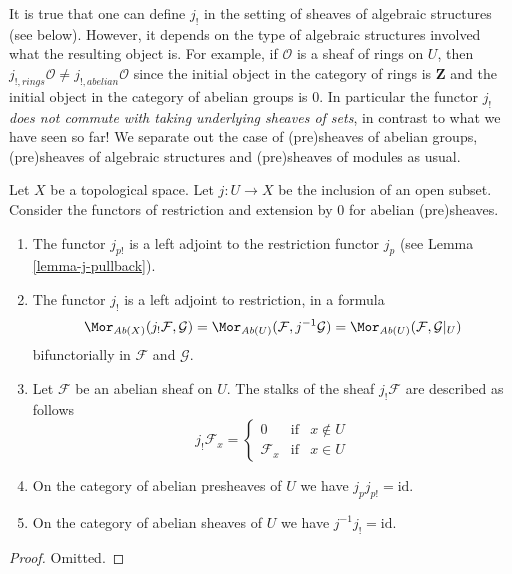 \noindent
It is true that one can define $j_!$ in the setting of sheaves
of algebraic structures (see below). However, it depends on the
type of algebraic structures involved what the resulting
object is. For example, if $\mathcal{O}$ is a sheaf of rings
on $U$, then $j_{!, rings}\mathcal{O} \not = j_{!, abelian}\mathcal{O}$
since the initial object in the category of rings
is $\mathbf{Z}$ and the initial object in the category
of abelian groups is $0$. In particular the functor $j_!$
{\it does not commute with taking underlying sheaves of sets},
in contrast to what we have seen so far! We separate out the case
of (pre)sheaves of abelian groups, (pre)sheaves of algebraic structures
and (pre)sheaves of modules as usual.

\begin{lemma}
\label{lemma-j-shriek-abelian}
Let $X$ be a topological space.
Let $j : U \to X$ be the inclusion of an open subset.
Consider the functors of restriction and extension
by $0$ for abelian (pre)sheaves.
\begin{enumerate}
\item The functor $j_{p!}$ is a left adjoint to the
restriction functor $j_p$ (see Lemma \ref{lemma-j-pullback}).
\item The functor $j_!$ is a left adjoint to restriction,
in a formula
$$
\Mor_{\textit{Ab}(X)}(j_!\mathcal{F}, \mathcal{G})
=
\Mor_{\textit{Ab}(U)}(\mathcal{F}, j^{-1}\mathcal{G})
=
\Mor_{\textit{Ab}(U)}(\mathcal{F}, \mathcal{G}|_U)
$$
bifunctorially in $\mathcal{F}$ and $\mathcal{G}$.
\item Let $\mathcal{F}$ be an abelian sheaf on $U$.
The stalks of the sheaf $j_!\mathcal{F}$ are described
as follows
$$
j_{!}\mathcal{F}_x =
\left\{
\begin{matrix}
0 & \text{if} & x \not \in U \\
\mathcal{F}_x & \text{if} & x \in U
\end{matrix}
\right.
$$
\item On the category of abelian presheaves of $U$
we have $j_pj_{p!} = \text{id}$.
\item On the category of abelian sheaves of $U$
we have $j^{-1}j_! = \text{id}$.
\end{enumerate}
\end{lemma}

\begin{proof}
Omitted.
\end{proof}

